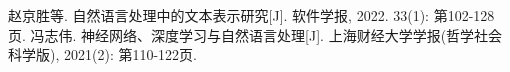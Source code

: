 \begin{thebibliography}{1}
	
	\bibitem{} 赵京胜等. 自然语言处理中的文本表示研究[J]. 软件学报, 2022. 33(1): 第102-128页.
	\bibitem{} 冯志伟. 神经网络、深度学习与自然语言处理[J]. 上海财经大学学报(哲学社会科学版), 2021(2): 第110-122页.

	
\end{thebibliography}

